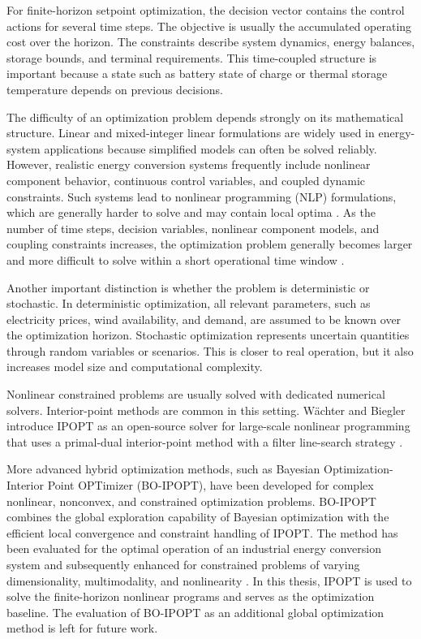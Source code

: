 \documentclass[12pt]{article}
\begin{document}
For finite-horizon setpoint optimization, the decision vector contains the control actions for several time steps. The objective is usually the accumulated operating cost over the horizon. The constraints describe system dynamics, energy balances, storage bounds, and terminal requirements. This time-coupled structure is important because a state such as battery state of charge or thermal storage temperature depends on previous decisions.

The difficulty of an optimization problem depends strongly on its mathematical structure. Linear and mixed-integer linear formulations are widely used in energy-system applications because simplified models can often be solved reliably. However, realistic energy conversion systems frequently include nonlinear component behavior, continuous control variables, and coupled dynamic constraints. Such systems lead to nonlinear programming (NLP) formulations, which are generally harder to solve and may contain local optima \cite{nocedal2006numerical}. As the number of time steps, decision variables, nonlinear component models, and coupling constraints increases, the optimization problem generally becomes larger and more difficult to solve within a short operational time window \cite{kyriakidis2024hybrid}.

Another important distinction is whether the problem is deterministic or stochastic. In deterministic optimization, all relevant parameters, such as electricity prices, wind availability, and demand, are assumed to be known over the optimization horizon. Stochastic optimization represents uncertain quantities through random variables or scenarios. This is closer to real operation, but it also increases model size and computational complexity.

Nonlinear constrained problems are usually solved with dedicated numerical solvers. Interior-point methods are common in this setting. Wächter and Biegler introduce IPOPT as an open-source solver for large-scale nonlinear programming that uses a primal-dual interior-point method with a filter line-search strategy \cite{wachter2006implementation}.

More advanced hybrid optimization methods, such as Bayesian Optimization-Interior Point OPTimizer (BO-IPOPT), have been developed for complex nonlinear, nonconvex, and constrained optimization problems. BO-IPOPT combines the global exploration capability of Bayesian optimization with the efficient local convergence and constraint handling of IPOPT. The method has been evaluated for the optimal operation of an industrial energy conversion system and subsequently enhanced for constrained problems of varying dimensionality, multimodality, and nonlinearity \cite{kyriakidis2024hybrid,kyriakidis2025enhanced}. In this thesis, IPOPT is used to solve the finite-horizon nonlinear programs and serves as the optimization baseline. The evaluation of BO-IPOPT as an additional global optimization method is left for future work.
\end{document}
